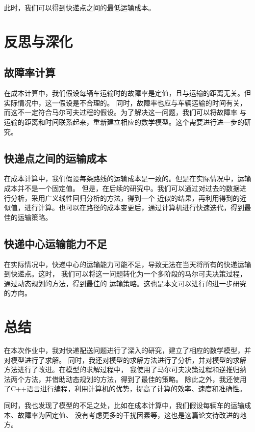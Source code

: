 \documentclass[UTF8]{ctexart}
\begin{document}
此时，我们可以得到快递点之间的最低运输成本。\cite{应用随机过程}

\section{反思与深化}

\subsection{故障率计算}

在成本计算中，我们假设每辆车运输时的故障率是定值，且与运输的距离无关。但实际情况中，这一假设是不合理的。
同时，故障率也应与车辆运输的时间有关，而这不一定符合马尔可夫过程的假设。为了解决这一问题，我们可以将故障率
与运输的距离和时间联系起来，重新建立相应的数学模型。这个需要进行进一步的研究。

\subsection{快递点之间的运输成本}

在成本计算中，我们假设每条路线的运输成本是一致的。但是在实际情况中，运输成本并不是一个固定值。
但是，在后续的研究中。我们可以通过对过去的数据进行分析，采用广义线性回归分析的方法，得到一个
近似的结果，再利用得到的近似值，进行计算。也可以在路径的成本变更后，通过计算机进行快速迭代，得到最佳的运输策略。


\subsection{快递中心运输能力不足}

在实际情况中，快递中心的运输能力可能不足，导致无法在当天将所有的快递运输到快递点。这时，
我们可以将这一问题转化为一个多阶段的马尔可夫决策过程，通过动态规划的方法，得到最佳的
运输策略。这也是本文可以进行的进一步研究的方向。

\section{总结}

在本次作业中，我对快递配送问题进行了深入的研究，建立了相应的数学模型，并对模型进行了求解。
同时，我还对模型的求解方法进行了分析，并对模型的求解方法进行了改进。在模型的求解过程中，
我使用了马尔可夫决策过程和逆推归纳法两个方法，并借助动态规划的方法，得到了最佳的策略。
除此之外，我还使用了C++语言进行编程，利用计算机的优势，提高了计算的效率、速度和准确性。

同时，我也发现了模型的不足之处，比如在成本计算中，我们假设每辆车的运输成本、故障率为固定值、
没有考虑更多的干扰因素等，这也是这篇论文待改进的地方。
\end{document}
